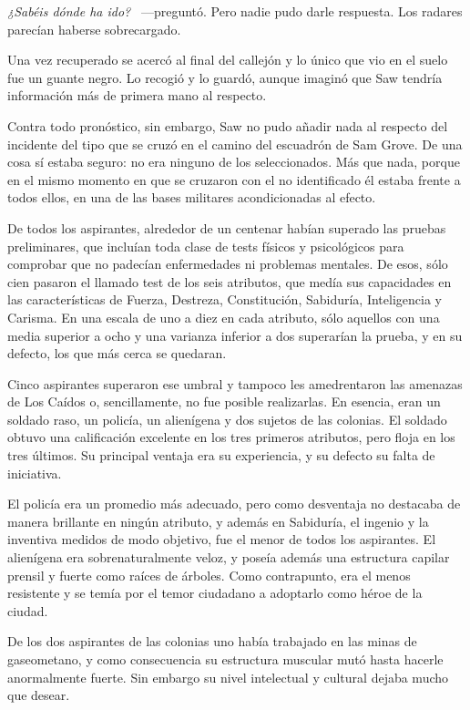 \emph{¿Sabéis dónde ha ido?} ~---preguntó. Pero nadie pudo darle respuesta. Los radares parecían haberse sobrecargado.

Una vez recuperado se acercó al final del callejón y lo único que vio en el suelo fue un guante negro. Lo recogió y lo guardó, aunque imaginó que Saw tendría información más de primera mano al respecto.

\parbreak
Contra todo pronóstico, sin embargo, Saw no pudo añadir nada al respecto del incidente del tipo que se cruzó en el camino del escuadrón de Sam Grove. De una cosa sí estaba seguro: no era ninguno de los seleccionados. Más que nada, porque en el mismo momento en que se cruzaron con el no identificado él estaba frente a todos ellos, en una de las bases militares acondicionadas al efecto.

De todos los aspirantes, alrededor de un centenar habían superado las pruebas preliminares, que incluían toda clase de tests físicos y psicológicos para comprobar que no padecían enfermedades ni problemas mentales. De esos, sólo cien pasaron el llamado test de los seis atributos, que medía sus capacidades en las características de Fuerza, Destreza, Constitución, Sabiduría, Inteligencia y Carisma. En una escala de uno a diez en cada atributo, sólo aquellos con una media superior a ocho y una varianza inferior a dos superarían la prueba, y en su defecto, los que más cerca se quedaran.

Cinco aspirantes superaron ese umbral y tampoco les amedrentaron las amenazas de Los Caídos o, sencillamente, no fue posible realizarlas. En esencia, eran un soldado raso, un policía, un alienígena y dos sujetos de las colonias. El soldado obtuvo una calificación excelente en los tres primeros atributos, pero floja en los tres últimos. Su principal ventaja era su experiencia, y su defecto su falta de iniciativa.

El policía era un promedio más adecuado, pero como desventaja no destacaba de manera brillante en ningún atributo, y además en Sabiduría, el ingenio y la inventiva medidos de modo objetivo, fue el menor de todos los aspirantes. El alienígena era sobrenaturalmente veloz, y poseía además una estructura capilar prensil y fuerte como raíces de árboles. Como contrapunto, era el menos resistente y se temía por el temor ciudadano a adoptarlo como héroe de la ciudad.

De los dos aspirantes de las colonias uno había trabajado en las minas de gaseometano, y como consecuencia su estructura muscular mutó hasta hacerle anormalmente fuerte. Sin embargo su nivel intelectual y cultural dejaba mucho que desear.

